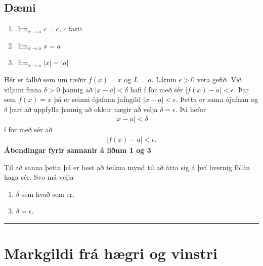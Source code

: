 \documentclass[b5paper,11pt,icelandic]{sphinxmanual}
\begin{document}
\subsection{Dæmi}
\label{kafli02:daemi}\label{kafli02:daemi2-1}\begin{enumerate}
\item {} 
\(\lim_{x \to a} c = c\), \(c\) fasti

\item {} 
\(\lim_{x \to a} x = a\)

\item {} 
\(\lim_{x \to a} |x| = |a|\)

\end{enumerate}

Hér er fallið sem um ræðir \(f(x) = x\) og \(L=a\).
Látum \(\epsilon>0\) vera gefið. Við viljum finna
\(\delta >0\) þannig að \(|x-a|<\delta\) hafi í för
með sér \(|f(x)-a| < \epsilon\). Þar sem \(f(x)=x\) þá er seinni
ójafnan jafngild \(|x-a|<\epsilon\). Þetta er sama ójafnan og
\(\delta\) þarf að uppfylla þannig að okkur nægir að velja
\(\delta = \epsilon\). Þá hefur
\begin{equation*}
\begin{split}|x-a| < \delta\end{split}
\end{equation*}
í för með sér að
\begin{equation*}
\begin{split}|f(x) -a| < \epsilon.\end{split}
\end{equation*}
\textbf{Ábendingar fyrir sannanir á liðum 1 og 3}

Til að sanna þetta þá er best að teikna mynd til að átta sig á því hvernig
föllin haga sér. Svo má velja
\begin{enumerate}
\item {} 
\(\delta\) sem hvað sem er.

\end{enumerate}
\begin{enumerate}
\setcounter{enumi}{2}
\item {} 
\(\delta=\epsilon\).

\end{enumerate}


\bigskip\hrule{}\bigskip



\section{Markgildi frá hægri og vinstri}
\label{kafli02:markgildi-fra-haegri-og-vinstri}
\end{document}
